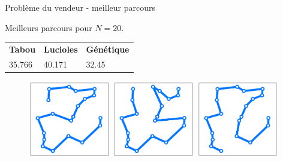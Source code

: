 \documentclass{beamer}
\begin{document}
\begin{frame}{Problème du vendeur - meilleur parcours}
\begin{center}
  Meilleurs parcours pour $N=20$.
\end{center}
\vspace{-0.5cm}
\begin{table}
  \centering
  \begin{tabular}{C{3cm}C{3cm}C{3cm}}
  \textbf{Tabou} & \textbf{Lucioles} & \textbf{Génétique}\\
  35.766 & 40.171 & 32.45
  \end{tabular}
\end{table}
\vspace{-1cm}
\begin{figure}[h!]
  \centering
  \includegraphics[width=0.32\textwidth]{figures/salesman_tabu_n20.pdf}
    \includegraphics[width=0.32\textwidth]{figures/salesman_firefly_n20.pdf}
    \includegraphics[width=0.32\textwidth]{figures/salesman_genetic_n20.pdf}
\end{figure}
  


\end{frame}
\end{document}
